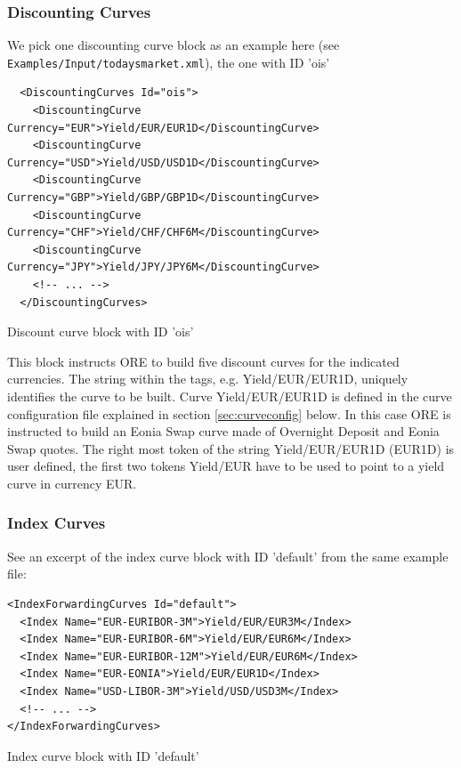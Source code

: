 \documentclass[12pt, a4paper]{article}
\begin{document}
\subsubsection{Discounting Curves} 

We pick one discounting curve block as an example here (see {\tt Examples/Input/todaysmarket.xml}), the one with ID 'ois' 

\begin{listing}[H]
\begin{verbatim}
  <DiscountingCurves Id="ois">
    <DiscountingCurve Currency="EUR">Yield/EUR/EUR1D</DiscountingCurve>
    <DiscountingCurve Currency="USD">Yield/USD/USD1D</DiscountingCurve>
    <DiscountingCurve Currency="GBP">Yield/GBP/GBP1D</DiscountingCurve>
    <DiscountingCurve Currency="CHF">Yield/CHF/CHF6M</DiscountingCurve>
    <DiscountingCurve Currency="JPY">Yield/JPY/JPY6M</DiscountingCurve>
    <!-- ... -->
  </DiscountingCurves>
\end{verbatim}
\caption{Discount curve block with ID 'ois'}
\label{lst:discountcurve_spec}
\end{listing}

This block instructs ORE to build five discount curves for the indicated currencies. The string within the tags,
e.g. Yield/EUR/EUR1D, uniquely identifies the curve to be built.  Curve Yield/EUR/EUR1D is defined in the curve
configuration file explained in section \ref{sec:curveconfig} below. In this case ORE is instructed to build an Eonia
Swap curve made of Overnight Deposit and Eonia Swap quotes. The right most token of the string Yield/EUR/EUR1D (EUR1D)
is user defined, the first two tokens Yield/EUR have to be used to point to a yield curve in currency EUR.
 
\subsubsection{Index Curves} 

See an excerpt of the index curve block with ID 'default' from the same example file:

\begin{listing}[H]
\begin{verbatim}
<IndexForwardingCurves Id="default">
  <Index Name="EUR-EURIBOR-3M">Yield/EUR/EUR3M</Index>
  <Index Name="EUR-EURIBOR-6M">Yield/EUR/EUR6M</Index>
  <Index Name="EUR-EURIBOR-12M">Yield/EUR/EUR6M</Index>
  <Index Name="EUR-EONIA">Yield/EUR/EUR1D</Index>
  <Index Name="USD-LIBOR-3M">Yield/USD/USD3M</Index>
  <!-- ... -->
</IndexForwardingCurves>
\end{verbatim}
\caption{Index curve block with ID 'default'}
\label{lst:indexcurve_spec}
\end{listing}
\end{document}
